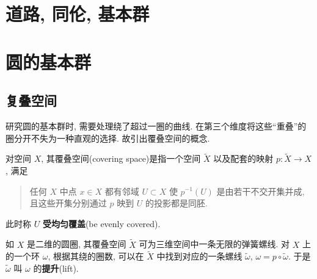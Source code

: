 \section{道路, 同伦, 基本群}

\section{圆的基本群}

\subsection{复叠空间}
研究圆的基本群时, 需要处理绕了超过一圈的曲线. 在第三个维度将这些``重叠''的圈分开不失为一种直观的选择. 故引出覆叠空间的概念.

对空间 $X$, 其覆叠空间(covering space)是指一个空间 $\tilde{X}$ 以及配套的映射 $p: \tilde{X} \rightarrow X$, 满足
\begin{quote}
    任何 $X$ 中点 $x \in X$ 都有邻域 $U \subset X$ 使 $p^{-1}(U)$ 是由若干不交开集并成, 且这些开集分别通过 $p$ 映到 $U$ 的投影都是同胚.
\end{quote}
此时称 $U$ \textbf{受均匀覆盖}(be evenly covered).

如 $X$ 是二维的圆圈, 其覆叠空间 $\tilde{X}$ 可为三维空间中一条无限的弹簧螺线. 对 $X$ 上的一个环 $\omega$, 根据其绕的圈数, 可以在 $\tilde{X}$ 中找到对应的一条螺线 $\tilde{\omega}$, $\omega = p \circ \tilde{\omega}$. 于是 $\tilde{\omega}$ 叫 $\omega$ 的\textbf{提升}(lift). 